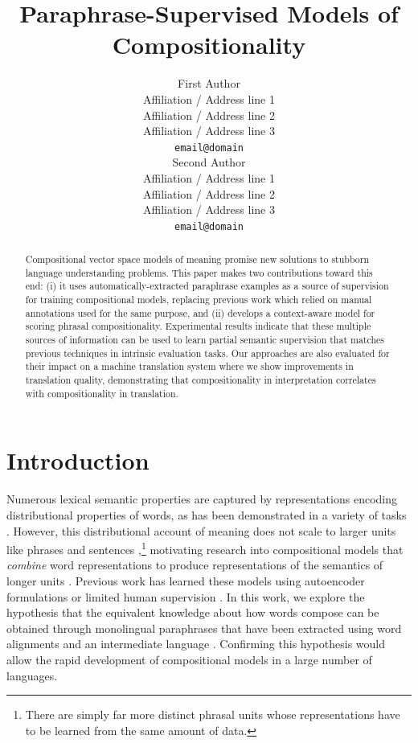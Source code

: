 \documentclass[11pt]{article}
\title{Paraphrase-Supervised Models of Compositionality}
\author{First Author \\
  Affiliation / Address line 1 \\
  Affiliation / Address line 2 \\
  Affiliation / Address line 3 \\
  {\tt email@domain} \\\And
  Second Author \\
  Affiliation / Address line 1 \\
  Affiliation / Address line 2 \\
  Affiliation / Address line 3 \\
  {\tt email@domain} \\}
\date{}
\begin{document}
\maketitle
\begin{abstract}
Compositional vector space models of meaning promise new solutions to stubborn language understanding problems. 
This paper makes two contributions toward this end: (i) it uses automatically-extracted paraphrase examples as a source of supervision for training compositional models, replacing previous work which relied on manual annotations used for the same purpose, and (ii) develops a context-aware model for scoring phrasal compositionality. 
	Experimental results indicate that these multiple sources of information can be used to learn partial semantic supervision that matches previous techniques in intrinsic evaluation tasks. 
	Our approaches are also evaluated for their impact on a machine translation system where we show improvements in translation quality, demonstrating that compositionality in interpretation correlates with compositionality in translation. 
 \end{abstract}

\section{Introduction}

Numerous lexical semantic properties are captured by representations encoding distributional properties of words, as has been demonstrated in a variety of tasks \cite{Turian2010,Turney2010,Mikolov2013b}.
However, this distributional account of meaning does not scale to larger units like phrases and sentences \cite[\emph{inter alia}]{Sahlgren2006,Collobert2011},\footnote{There are simply far more distinct phrasal units whose representations have to be learned from the same amount of data.} motivating research into compositional models that \emph{combine} word representations to produce representations of the semantics of longer units \cite{Mitchell2010,Baroni2010,Socher2013}.  
Previous work has learned these models using autoencoder formulations \cite{Socher2011} or limited human supervision \cite{Mitchell2010}.
In this work, we explore the hypothesis that the equivalent knowledge about how words compose can be obtained through monolingual paraphrases that have been extracted using word alignments and an intermediate language \cite{Ganitkevich2013}.
Confirming this hypothesis would allow the rapid development of compositional models in a large number of languages. 
\end{document}

